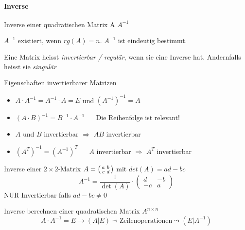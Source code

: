 \paragraph{Inverse}
    \begin{definition}{Inverse einer quadratischen Matrix A} $A^{-1}$ 
        
        $A^{-1}$ existiert, wenn $rg(A) = n$. $A^{-1}$ ist eindeutig bestimmt.

        \vspace{1mm}

        {\small Eine Matrix heisst \textit{invertierbar / regulär}, wenn sie eine Inverse hat. 
        Andernfalls heisst sie \textit{singulär}}
    \end{definition}
  
    \begin{theorem}{Eigenschaften invertierbarer Matrizen}
        \begin{itemize}
            \item $A\cdot A^{-1}=A^{-1}\cdot A=E$ und $(A^{-1})^{-1}=A$
            \item ${(A\cdot B)}^{-1}=B^{-1}\cdot A^{-1}$ {\small $\quad$ Die Reihenfolge ist relevant!}
            \item $A$ und $B$ invertierbar $\Rightarrow$ $AB$ invertierbar
            \item ${(A^T)^{-1}}={(A^{-1})}^T$ $\quad$ $A$ invertierbar $\Rightarrow$ $A^T$ invertierbar
        \end{itemize}
    \end{theorem}

\begin{theorem}{Inverse einer $2 \times 2$-Matrix} $A = \begin{psmallmatrix} a & b \\ c & d \end{psmallmatrix}$ mit $det(A) = ad - bc$
        $$A^{-1} = \frac{1}{\det(A)} \cdot \begin{pmatrix} d & -b \\ -c & a \end{pmatrix}$$
        NUR Invertierbar falls $ad - bc \neq 0$
\end{theorem}

\begin{KR}{Inverse berechnen} einer quadratischen Matrix $A^{n \times n}$
    $$A \cdot A^{-1} = E \rightarrow \left( A | E \right) \leadsto \text{Zeilenoperationen} \leadsto \left( E | A^{-1}\right)$$
\end{KR}

